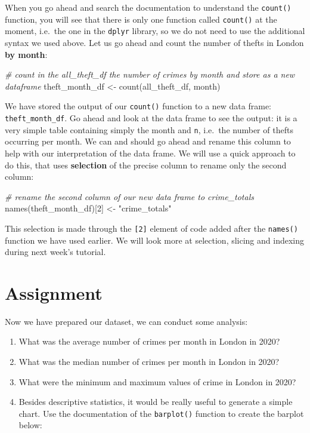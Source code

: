\documentclass[
]{book}
\newenvironment{Shaded}{\begin{snugshade}}{\end{snugshade}}
\newcommand{\CommentTok}[1]{\textcolor[rgb]{0.56,0.35,0.01}{\textit{#1}}}
\newcommand{\DecValTok}[1]{\textcolor[rgb]{0.00,0.00,0.81}{#1}}
\newcommand{\FunctionTok}[1]{\textcolor[rgb]{0.00,0.00,0.00}{#1}}
\newcommand{\NormalTok}[1]{#1}
\newcommand{\OtherTok}[1]{\textcolor[rgb]{0.56,0.35,0.01}{#1}}
\newcommand{\StringTok}[1]{\textcolor[rgb]{0.31,0.60,0.02}{#1}}
\providecommand{\tightlist}{%
  \setlength{\itemsep}{0pt}\setlength{\parskip}{0pt}}
\begin{document}
When you go ahead and search the documentation to understand the \texttt{count()} function, you will see that there is only one function called \texttt{count()} at the moment, i.e.~the one in the \texttt{dplyr} library, so we do not need to use the additional syntax we used above. Let us go ahead and count the number of thefts in London \textbf{by month}:

\begin{Shaded}
\begin{Highlighting}[]
\CommentTok{\# count in the all\_theft\_df the number of crimes by month and store as a new dataframe}
\NormalTok{theft\_month\_df }\OtherTok{\textless{}{-}} \FunctionTok{count}\NormalTok{(all\_theft\_df, month)}
\end{Highlighting}
\end{Shaded}

We have stored the output of our \texttt{count()} function to a new data frame: \texttt{theft\_month\_df}. Go ahead and look at the data frame to see the output: it is a very simple table containing simply the month and \texttt{n}, i.e.~the number of thefts occurring per month. We can and should go ahead and rename this column to help with our interpretation of the data frame. We will use a quick approach to do this, that uses \textbf{selection} of the precise column to rename only the second column:

\begin{Shaded}
\begin{Highlighting}[]
\CommentTok{\# rename the second column of our new data frame to crime\_totals}
\FunctionTok{names}\NormalTok{(theft\_month\_df)[}\DecValTok{2}\NormalTok{] }\OtherTok{\textless{}{-}} \StringTok{"crime\_totals"}
\end{Highlighting}
\end{Shaded}

This selection is made through the \texttt{{[}2{]}} element of code added after the \texttt{names()} function we have used earlier. We will look more at selection, slicing and indexing during next week's tutorial.

\hypertarget{assignment-w04}{%
\section{Assignment}\label{assignment-w04}}

Now we have prepared our dataset, we can conduct some analysis:

\begin{enumerate}
\def\labelenumi{\arabic{enumi}.}
\tightlist
\item
  What was the average number of crimes per month in London in 2020?
\item
  What was the median number of crimes per month in London in 2020?
\item
  What were the minimum and maximum values of crime in London in 2020?
\item
  Besides descriptive statistics, it would be really useful to generate a simple chart. Use the documentation of the \texttt{barplot()} function to create the barplot below:
\end{enumerate}
\end{document}
